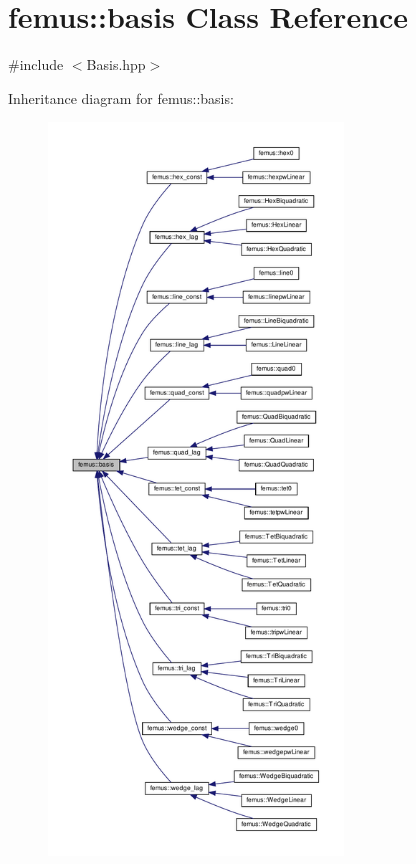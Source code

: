 \hypertarget{classfemus_1_1basis}{}\section{femus\+:\+:basis Class Reference}
\label{classfemus_1_1basis}


{\ttfamily \#include $<$Basis.\+hpp$>$}



Inheritance diagram for femus\+:\+:basis\+:
\nopagebreak
\begin{figure}[H]
\begin{center}
\leavevmode
\includegraphics[height=550pt]{classfemus_1_1basis__inherit__graph}
\end{center}
\end{figure}
